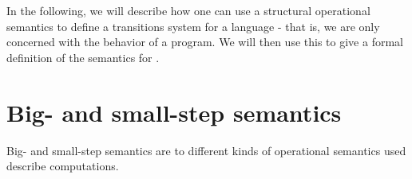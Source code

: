 In the following, we will describe how one can use a structural operational semantics to define a transitions system for a language - that is, we are only concerned with the behavior of a program. We will then use this to give a formal definition of the semantics for \dazel{}.

\section{Big- and small-step semantics}
Big- and small-step semantics are to different kinds of operational semantics used describe computations. 